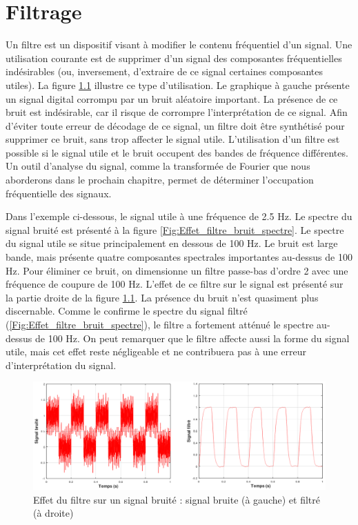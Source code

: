 \chapter{Filtrage}
\label{chap:filtrage}
	Un filtre est un dispositif visant à modifier le contenu fréquentiel d'un signal. Une utilisation courante est de supprimer d'un signal des composantes fréquentielles indésirables (ou, inversement, d'extraire de ce signal certaines composantes utiles). La figure \ref{Fig:Effet_filtre_bruit} illustre ce type d'utilisation. Le graphique à gauche présente un signal digital corrompu par un bruit aléatoire important. La présence de ce bruit est indésirable, car il risque de corrompre l'interprétation de ce signal. Afin d'éviter toute erreur de décodage de ce signal, un filtre doit être synthétisé pour supprimer ce bruit, sans trop affecter le signal utile. L'utilisation d'un filtre est possible si le signal utile et le bruit occupent des bandes de fréquence différentes. Un outil d'analyse du signal, comme la transformée de Fourier que nous aborderons dans le prochain chapitre, permet de déterminer l'occupation fréquentielle des signaux.
	
	Dans l'exemple ci-dessous, le signal utile à une fréquence de 2.5 Hz. Le spectre du signal bruité est présenté à la figure \ref{Fig:Effet_filtre_bruit_spectre}. Le spectre du signal utile se situe principalement en dessous de 100 Hz. Le bruit est large bande, mais présente quatre composantes spectrales importantes au-dessus de 100 Hz. Pour éliminer ce bruit, on dimensionne un filtre passe-bas d'ordre 2 avec une fréquence de coupure de 100 Hz. L'effet de ce filtre sur le signal est présenté sur la partie droite de la figure \ref{Fig:Effet_filtre_bruit}. La présence du bruit n'est quasiment plus discernable. Comme le confirme le spectre du signal filtré (\ref{Fig:Effet_filtre_bruit_spectre}), le filtre a fortement atténué le spectre au-dessus de 100 Hz. On peut remarquer que le filtre affecte aussi la forme du signal utile, mais cet effet reste négligeable et ne contribuera pas à une erreur d'interprétation du signal.  
	
	\begin{figure}[h]
		\centering
		\includegraphics[scale=0.6]{images/Effet_filtre_bruit.png}
		\caption{Effet du filtre sur un signal bruité : signal bruite (à gauche) et filtré (à droite)}	
		\label{Fig:Effet_filtre_bruit} 
	\end{figure}

